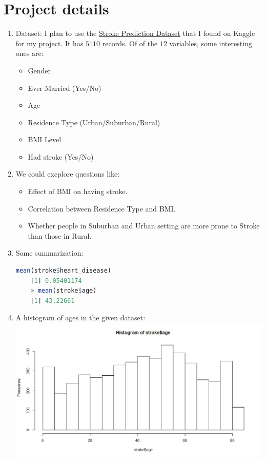 \documentclass[boxes, qed]{homework}
\begin{document}
\section{Project details}
\begin{enumerate}
  \item Dataset: I plan to use the  
  \href{https://www.kaggle.com/fedesoriano/stroke-prediction-dataset?select=healthcare-dataset-stroke-data.csv}
  {Stroke Prediction Dataset} that I found on Kaggle for my project. It has $5110$ records. 
  Of of the $12$ variables, some interesting ones are:
  \begin{itemize}
    \item Gender
    \item Ever Married (Yes/No)
    \item Age
    \item Residence Type (Urban/Suburban/Rural)
    \item BMI Level
    \item Had stroke (Yes/No)
  \end{itemize}

  \item We could excplore questions like:
  \begin{itemize}
    \item Effect of BMI on having stroke.
    \item Correlation between Residence Type and BMI.
    \item Whether people in Suburban and Urban setting are more prone to 
    Stroke than those in Rural.
  \end{itemize}

  \item Some summarization:
  \begin{lstlisting}[backgroundcolor = \color{lightgray},language = R]
    mean(stroke$heart_disease)
    [1] 0.05401174
    > mean(stroke$age)
    [1] 43.22661
  \end{lstlisting}

  \item A histogram of ages in the given dataset:\\
  \includegraphics[scale=.5]{stroke-ages}
\end{enumerate}
\end{document}
